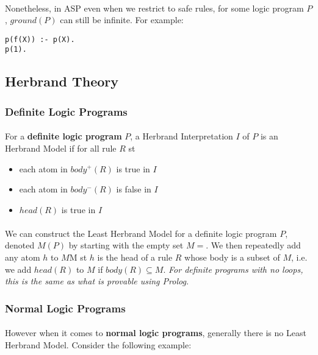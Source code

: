 \documentclass{article}
\theoremstyle{plain}
\theoremstyle{definition}
\begin{document}
\begin{multicols}{2}
\paragraph{} Nonetheless, in ASP even when we restrict to safe rules, for some logic program $P$, $ground(P)$ can still be infinite. For example:

\begin{lstlisting}
p(f(X)) :- p(X).
p(1).
\end{lstlisting}

\subsection{Herbrand Theory}

\subsubsection{Definite Logic Programs}

\paragraph{} For a \textbf{definite logic program} $P$, a Herbrand Interpretation $I$ of $P$ is an Herbrand Model if for all rule $R$ st

\begin{itemize}
\item each atom in $body^+(R)$ is true in $I$
\item each atom in $body^-(R)$ is false in $I$
\item $head(R)$ is true in $I$
\end{itemize}

\paragraph{} We can construct the Least Herbrand Model for a definite logic program $P$, denoted $M(P)$ by starting with the empty set $M = {}$. We then repeatedly add any atom $h$ to $M$M st $h$ is the head of a rule $R$ whose body is a subset of $M$, i.e. we add $head(R)$ to $M$ if $body(R) \subseteq M$. \textit{For definite programs with no loops, this is the same as what is provable using Prolog.}

\subsubsection{Normal Logic Programs}

\paragraph{} However when it comes to \textbf{normal logic programs}, generally there is no Least Herbrand Model. Consider the following example:


\end{multicols}
\end{document}
